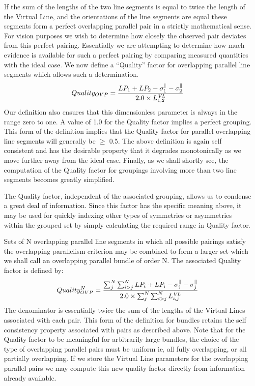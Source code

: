  If the sum of the lengths of the two line segments is equal to twice the 
length of the Virtual Line, and the orientations of the line segments are 
equal these segments form a perfect overlapping parallel pair in a strictly 
mathematical sense. For vision purposes we wish to determine how closely the
observed pair deviates from this perfect pairing. Essentially we are 
attempting to determine how much evidence is available for such a perfect
pairing by comparing measured quantities with the ideal case. We now define a 
``Quality'' factor for overlapping parallel line segments which allows such a 
determination.
\vspace{-2mm}
\begin{equation}
 Quality_{OVP} = \frac {LP_{1} + LP_{2}
         - \sigma^{\parallel}_{1} - \sigma^{\parallel}_{2} }
{2.0 \times L^{\it VL}_{1,2}}
\label{equ:qualovp}
\end{equation}
\vspace{-2mm}
 Our definition also ensures that this dimensionless parameter is always in 
the range zero to one. A value of 1.0 for the Quality factor implies a perfect
grouping. This form of the definition implies that the Quality factor for 
parallel overlapping line segments will generally be $\geq$ 0.5. The above 
definition is again self consistent and has the desirable property that it 
degrades monotonically as we move further away from the ideal case. Finally, 
as we shall shortly see, the computation of the Quality factor for groupings 
involving more than two line segments becomes greatly simplified.

The Quality factor, independent of the associated grouping, allows us to 
condense a great deal of information. Since this factor has the specific 
meaning above, it may be used for quickly indexing other types of symmetries 
or asymmetries within the grouped set by simply calculating the required 
range in Quality factor. 

 Sets of N overlapping parallel line segments in which all possible pairings 
satisfy the overlapping parallelism criterion may be combined to form a larger 
set which we shall call an overlapping parallel bundle of order N. The 
associated Quality factor is defined by:
\vspace{-2mm}
\begin{equation}
 Quality_{OVP}^{N} = 
\frac { \sum^{N}_{j} \sum^{N}_{i>j} LP_{i} + LP_{i} - 
        \sigma^{\parallel}_{i} - \sigma^{\parallel}_{j} }
{
2.0 \times \sum^{N}_{j} \sum^{N}_{i>j} {L^{\it VL}_{i,j}}
}
\label{equ:qualbundle}
\end{equation}
\vspace{-2mm}
 The denominator is essentially twice the sum of the lengths of the Virtual 
Lines associated with each pair. This form of the definition for bundles 
retains the self consistency property associated with pairs as described 
above. Note that for the Quality factor to be meaningful for arbitrarily large
bundles, the choice of the type of overlapping parallel pairs must be uniform 
ie, all fully overlapping, or all partially overlapping. If we 
store the Virtual Line parameters for the overlapping parallel pairs we may 
compute this new quality factor directly from information already available. 

